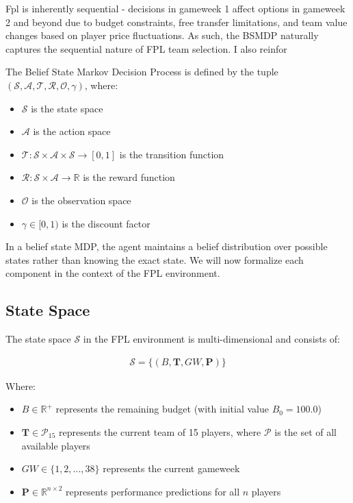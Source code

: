 Fpl is inherently sequential - decisions in gameweek 1 affect options in gameweek 2 and beyond due to budget constraints, free transfer limitations, and team value changes based on player price fluctuations. As such, the BSMDP naturally captures the sequential nature of FPL team selection. I also reinfor

The Belief State Markov Decision Process is defined by the tuple $(\mathcal{S}, \mathcal{A}, \mathcal{T}, \mathcal{R}, \mathcal{O}, \gamma)$, where:
\begin{itemize}
    \item $\mathcal{S}$ is the state space
    \item $\mathcal{A}$ is the action space
    \item $\mathcal{T}: \mathcal{S} \times \mathcal{A} \times \mathcal{S} \rightarrow [0, 1]$ is the transition function
    \item $\mathcal{R}: \mathcal{S} \times \mathcal{A} \rightarrow \mathbb{R}$ is the reward function
    \item $\mathcal{O}$ is the observation space
    \item $\gamma \in [0, 1)$ is the discount factor
\end{itemize}

In a belief state MDP, the agent maintains a belief distribution over possible states rather than knowing the exact state. We will now formalize each component in the context of the FPL environment.

\subsection{State Space}

The state space $\mathcal{S}$ in the FPL environment is multi-dimensional and consists of:

\begin{align}
\mathcal{S} = \{(B, \mathbf{T}, GW, \mathbf{P})\}
\end{align}

Where:
\begin{itemize}
    \item $B \in \mathbb{R}^+$ represents the remaining budget (with initial value $B_0 = 100.0$)
    \item $\mathbf{T} \in \mathcal{P}_{15}$ represents the current team of 15 players, where $\mathcal{P}$ is the set of all available players
    \item $GW \in \{1, 2, ..., 38\}$ represents the current gameweek
    \item $\mathbf{P} \in \mathbb{R}^{n \times 2}$ represents performance predictions for all $n$ players
\end{itemize}

